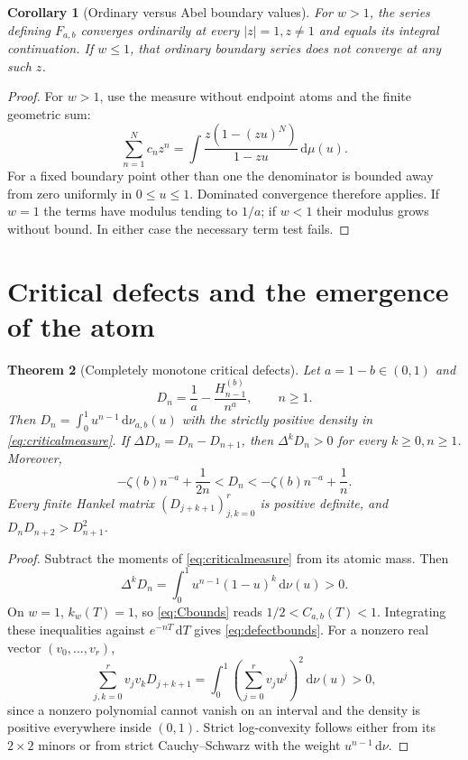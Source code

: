 \documentclass[11pt]{article}
\numberwithin{equation}{section}
\newtheorem{theorem}{Theorem}[section]
\newtheorem{corollary}[theorem]{Corollary}
\theoremstyle{definition}\newtheorem{definition}[theorem]{Definition}
\theoremstyle{remark}\newtheorem{remark}[theorem]{Remark}
\newcommand{\dd}{\,\mathrm d}
\begin{document}
\begin{corollary}[Ordinary versus Abel boundary values]\label{cor:boundary}
For $w>1$, the series defining $F_{a,b}$ converges ordinarily at every
$|z|=1,z\ne1$ and equals its integral continuation. If $w\le1$, that
ordinary boundary series does not converge at any such $z$.
\end{corollary}
\begin{proof}
For $w>1$, use the measure without endpoint atoms and the finite
geometric sum:
\[
 \sum_{n=1}^Nc_nz^n
 =\int\frac{z(1-(zu)^N)}{1-zu}\dd\mu(u).
\]
For a fixed boundary point other than one the denominator is bounded
away from zero uniformly in $0\le u\le1$. Dominated convergence
therefore applies. If $w=1$ the terms have modulus tending to $1/a$;
if $w<1$ their modulus grows without bound. In either case the
necessary term test fails.
\end{proof}

\section{Critical defects and the emergence of the atom}
\label{sec:defects}

\begin{theorem}[Completely monotone critical defects]\label{thm:defect}
Let $a=1-b\in(0,1)$ and
\[
 D_n=\frac1a-\frac{H_{n-1}^{(b)}}{n^a},\qquad n\ge1.
\]
Then $D_n=\int_0^1u^{n-1}\dd\nu_{a,b}(u)$ with the strictly positive
density in \eqref{eq:criticalmeasure}. If $\Delta D_n=D_n-D_{n+1}$,
then $\Delta^kD_n>0$ for every $k\ge0,n\ge1$. Moreover,
\begin{equation}\label{eq:defectbounds}
 -\zeta(b)n^{-a}+\frac1{2n}<D_n
 <-\zeta(b)n^{-a}+\frac1n.
\end{equation}
Every finite Hankel matrix $(D_{j+k+1})_{j,k=0}^r$ is positive
definite, and $D_nD_{n+2}>D_{n+1}^2$.
\end{theorem}
\begin{proof}
Subtract the moments of \eqref{eq:criticalmeasure} from its atomic
mass. Then
\[
 \Delta^kD_n=\int_0^1u^{n-1}(1-u)^k\dd\nu(u)>0.
\]
On $w=1$, $k_w(T)=1$, so \eqref{eq:Cbounds} reads
$1/2<C_{a,b}(T)<1$. Integrating these inequalities against
$e^{-nT}\dd T$ gives \eqref{eq:defectbounds}.
For a nonzero real vector $(v_0,\ldots,v_r)$,
\[
 \sum_{j,k=0}^rv_jv_kD_{j+k+1}
 =\int_0^1\left(\sum_{j=0}^rv_ju^j\right)^2\dd\nu(u)>0,
\]
since a nonzero polynomial cannot vanish on an interval and the
density is positive everywhere inside $(0,1)$. Strict log-convexity
follows either from its $2\times2$ minors or from strict
Cauchy--Schwarz with the weight $u^{n-1}\dd\nu$.
\end{proof}
\end{document}
